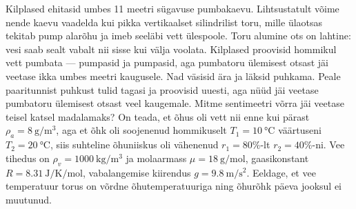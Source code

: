 \documentclass[10pt]{article}
\begin{document}
\newcommand{\magnetvali}{
    \begin{tikzpicture}[scale=0.70]
        \draw (-4,0) -- (4,0);
        \draw (0,-4) -- (0,4);

        \draw[thick,->] (0,2) node [anchor = east] {$(0,h)$}
                            -- ++(60:1.6)
                            node [midway, anchor = west] {$\Vec{v}$};
        \draw (0,2) -- ++ (60:1) node [midway, anchor = south east, xshift = 6] {$\alpha$}
            arc (60:90:1);

        \draw (-2,2) circle (0.25) node[above, anchor = south, yshift = 5] {$B_1$};
        \filldraw (-2,2) circle (0.05);
        
        \draw (2,-2) circle (0.25) node[above, anchor = south, yshift = 5] {$B_1$};
        \filldraw (2,-2) circle (0.05);

        \draw (2,2) circle (0.25) node[above, anchor = south, yshift = 5] {$B_2$};
        \draw (2.25,2) -- (1.75,2);
        \draw (2,1.75) -- (2,2.25);

        \draw (-2,-2) circle (0.25) node[above, anchor = south, yshift = 5] {$B_2$};
        \draw (-2.25,-2) -- (-1.75,-2);
        \draw (-2,-1.75) -- (-2,-2.25);
        
    \end{tikzpicture}
} 

\setlength{\columnsep}{20pt}
\probend
\bigskip


Kilplased ehitasid umbes 11 meetri sügavuse pumbakaevu. Lihtsustatult võime nende kaevu vaadelda kui pikka vertikaalset silindrilist toru, mille ülaotsas tekitab pump alarõhu ja imeb seeläbi vett ülespoole. Toru alumine ots on lahtine: vesi saab sealt vabalt nii sisse kui välja voolata. Kilplased proovisid hommikul vett pumbata --- pumpasid ja pumpasid, aga pumbatoru ülemisest otsast jäi veetase ikka umbes meetri kaugusele.  Nad väsisid ära ja läksid puhkama. Peale paaritunnist puhkust tulid tagasi ja proovisid uuesti, aga nüüd jäi  veetase pumbatoru ülemisest otsast veel kaugemale. Mitme sentimeetri võrra jäi veetase teisel katsel madalamaks? On teada, et õhus oli vett nii enne kui pärast $\rho_a=\SI{8}{\g\per\m\cubed}$, aga et õhk oli soojenenud hommikuselt $T_1=\SI{10}{\celsius}$ väärtuseni $T_2=\SI{20}{\celsius}$, siis suhteline õhuniiskus oli vähenenud $r_1=80\%$-lt $r_2=40\%$-ni. Vee tihedus on $\rho_v=\SI{1000}{\kg\per\m\cubed}$ ja molaarmass $\mu=\SI{18}{\g\per\mol}$, gaasikonstant $R=\SI{8.31}{\joule\per\kelvin\per\mol}$, vabalangemise kiirendus $g=\SI{9.8}{\m\per\s\squared}$. Eeldage, et vee temperatuur torus on võrdne õhutemperatuuriga ning õhurõhk päeva jooksul ei muutunud.
\probend
\bigskip
\end{document}
